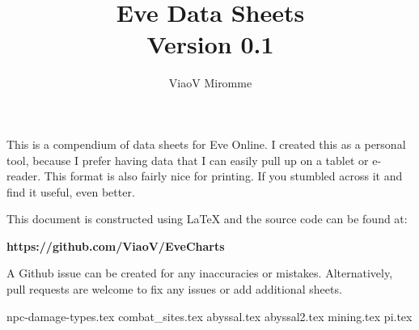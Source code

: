 
\title{Eve Data Sheets\\
\large Version 0.1}
\author{ViaoV Miromme}

\maketitle

\vspace{0.5in}

This is a compendium of data sheets for Eve Online.  I created this as a 
personal tool, because I prefer having data that I can easily pull up on a 
tablet or e-reader. This format is also fairly nice for printing.
If you stumbled across it and find it useful, even better.

\vspace{\baselineskip}

This document is constructed using LaTeX and the source code can be found at: 

\smallskip
\begin{center}
\textbf{https://github.com/ViaoV/EveCharts}
\end{center}
\vspace{\baselineskip}

A Github issue can be created for any inaccuracies or mistakes. 
Alternatively, pull requests are welcome to fix any issues or add additional 
sheets.

\newpage
\tableofcontents
\setup
\newpage
\small
{npc-damage-types.tex}
\newpage
{combat_sites.tex}
\newpage
{abyssal.tex}
\newpage
{abyssal2.tex}
\newpage
{mining.tex}
\newpage
{pi.tex}
%
%
%
%
%



